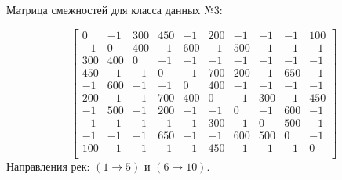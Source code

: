 Матрица смежностей для класса данных №3:

\begin{equation*}
\begin{bmatrix}
0   & -1 &  300 & 450 & -1 &  200 & -1  & -1  & -1 &  100 \\
-1 &  0 &   400 & -1 &  600 & -1 &  500 & -1 &  -1  & -1 \\
300 & 400 & 0   & -1 &  -1 &  -1 &  -1 &  -1  & -1  & -1 \\
450 & -1 &  -1 &  0  &  -1 &  700 & 200 & -1 &  650 & -1 \\
-1  & 600 & -1 &  -1 &  0 &   400 & -1  & -1 &  -1  & -1 \\
200 & -1 &  -1  & 700 & 400 & 0  &  -1 &  300 & -1  & 450 \\
-1  & 500 & -1 &  200 & -1 &  -1 &  0  &  -1 &  600 & -1 \\
-1  & -1  & -1 &  -1 &  -1 &  300 & -1  & 0  &  500 & -1 \\
-1  & -1 &  -1 &  650 & -1  & -1 &  600 & 500 & 0  &  -1 \\
100 & -1  & -1 &  -1 &  -1 &  450 & -1 &  -1 &  -1 &  0 \\
\end{bmatrix}
\end{equation*}
Направления рек: $(1 \to 5)$ и $(6 \to 10)$.

